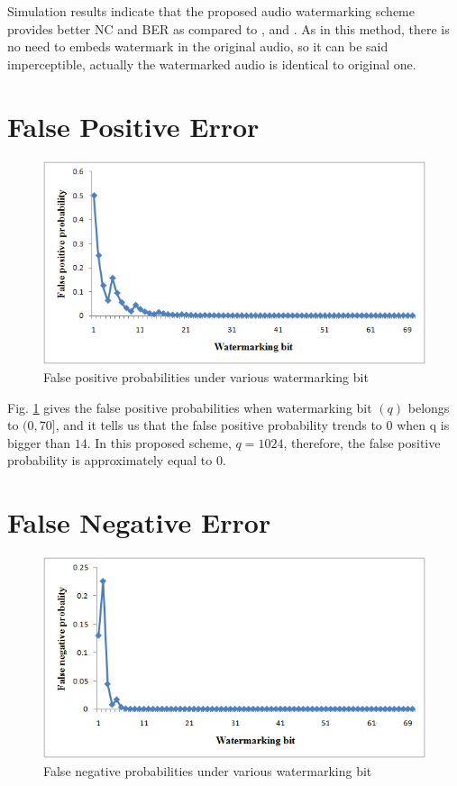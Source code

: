 \documentclass[12pt,a4paper]{report}
\begin{document}
\bigskip

Simulation results indicate that the proposed audio watermarking scheme provides better NC and BER as compared to \cite{dwt}, \cite{ieee} and \cite{energy}. As in this method, there is no need to embeds watermark in the original audio, so it can be said imperceptible, actually the watermarked audio is identical to original one.

\section{False Positive Error}

\begin{figure}[h!]
\centering
\includegraphics[scale=.8]{image/falsepositive.png}
\caption{False positive probabilities under various watermarking bit}
\label{fig:falsepositive}
\end{figure}

\bigskip

Fig. \ref{fig:falsepositive} gives the false positive probabilities when watermarking bit $(q)$ belongs to $(0, 70]$, and it tells us that the false positive probability trends to $0$ when q is bigger than $14$. In this proposed scheme, $q = 1024$, therefore, the false positive probability is approximately equal to 0.

\bigskip

\section{False Negative Error}

\begin{figure}[h!]
\centering
\includegraphics[scale=.8]{image/falsenegative.png}
\caption{False negative probabilities under various watermarking bit}
\label{fig:falsenegative}
\end{figure}
\end{document}
